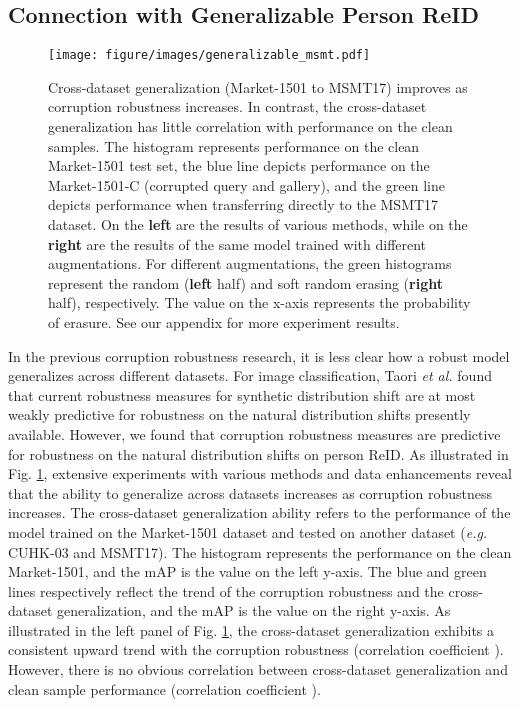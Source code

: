 \subsection{Connection with Generalizable Person ReID}

\begin{figure}[htbp]
    \centering
    \texttt{[image: figure/images/generalizable\_msmt.pdf]}
    \caption{Cross-dataset generalization (Market-1501 to MSMT17) improves as corruption robustness increases. In contrast, the cross-dataset generalization has little correlation with performance on the clean samples. The histogram represents performance on the clean Market-1501 test set, the blue line depicts performance on the Market-1501-C (corrupted query and gallery), and the green line depicts performance when transferring directly to the MSMT17 dataset. On the \textbf{left} are the results of various methods, while on the \textbf{right} are the results of the same model trained with different augmentations. For different augmentations, the green histograms represent the random (\textbf{left} half) and soft random erasing (\textbf{right} half), respectively. The value on the x-axis represents the probability of erasure. See our appendix for more experiment results.}
    \vspace{-3mm}
    \label{fig:generalizable}
\end{figure}
 
In the previous corruption robustness research, it is less clear how a robust model generalizes across different datasets.
For image classification, Taori \textit{et al.} \cite{DBLP:conf/nips/TaoriDSCRS20} found that current robustness measures for synthetic distribution shift are at most weakly predictive for robustness on the natural distribution shifts presently available.
However, we found that corruption robustness measures are predictive for robustness on the natural distribution shifts on person ReID.
As illustrated in Fig. \ref{fig:generalizable}, extensive experiments with various methods and data enhancements reveal that the ability to generalize across datasets increases as corruption robustness increases.
The cross-dataset generalization ability refers to the performance of the model trained on the Market-1501 dataset and tested on another dataset (\textit{e.g.} CUHK-03 and MSMT17).
The histogram represents the performance on the clean Market-1501, and the mAP is the value on the left y-axis.
The blue and green lines respectively reflect the trend of the corruption robustness and the cross-dataset generalization, and the mAP is the value on the right y-axis.
As illustrated in the left panel of Fig. \ref{fig:generalizable}, the cross-dataset generalization exhibits a consistent upward trend with the corruption robustness (correlation coefficient ). However, there is no obvious correlation between cross-dataset generalization and clean sample performance (correlation coefficient ).


